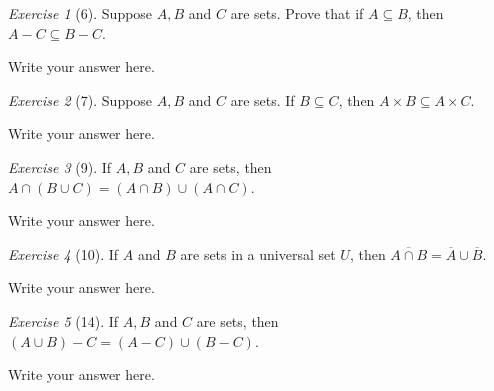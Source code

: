\documentclass[12pt]{amsart}
\makeatletter
\theoremstyle{remark}
\newtheorem*{exercise}{Exercise}%
\renewenvironment{proof}[1][\proofname]{\par\doublespacing
  \pushQED{\qed}%
  \normalfont \topsep6\p@\@plus6\p@\relax
  \list{}{%
    \settowidth{\leftmargin}{\itshape\proofname:\hskip\labelsep}%
    \setlength{\labelwidth}{0pt}%
    \setlength{\itemindent}{-\leftmargin}%
  }%
  \item[\hskip\labelsep\itshape#1\@addpunct{:}]\ignorespaces
}{%
  \popQED\endlist\@endpefalse
  \singlespacing
}
\theoremstyle{mycomment}
\makeatother
\begin{document}
\begin{exercise}[6] Suppose $A,B$ and $C$ are sets. Prove that if $A\subseteq B$, then $A-C\subseteq B-C$.
\begin{proof}
Write your answer here.
\end{proof}
\end{exercise}

\begin{exercise}[7] Suppose $A,B$ and $C$ are sets. If $B\subseteq C$, then $A\times B\subseteq A\times C$.
\begin{proof}
Write your answer here.
\end{proof}
\end{exercise}

\begin{exercise}[9] If $A,B$ and $C$ are sets, then $A\cap(B\cup C)=(A\cap B)\cup (A\cap C)$.
\begin{proof}
Write your answer here.
\end{proof}
\end{exercise}

\begin{exercise}[10] If $A$ and $B$ are sets in a universal set $U$, then $\overline{A\cap B}=\overline A\cup \overline B$.
\begin{proof}
Write your answer here.
\end{proof}
\end{exercise}

\begin{exercise}[14] If $A,B$ and $C$ are sets, then $(A\cup B)-C=(A-C)\cup (B-C)$.
\begin{proof}
Write your answer here.
\end{proof}
\end{exercise}
\end{document}
